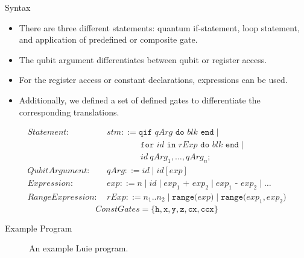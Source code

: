 \begin{frame}{Syntax}
    \begin{itemize}
        \item There are three different statements: quantum if-statement, loop statement, and application of predefined or composite gate.
        \item The qubit argument differentiates between qubit or register access.
        \item For the register access or constant declarations, expressions can be used.
        \item Additionally, we defined a set of defined gates to differentiate the corresponding translations.
    \end{itemize}
    \begin{align*}
        Statement: \ & stm ::= \texttt{qif } qArg \texttt{ do }  blk \texttt{ end} \mid\\
                     & \quad \quad \quad \quad \texttt{for } id \texttt{ in } rExp \texttt{ do } blk \texttt{ end} \mid \\
                     & \quad \quad \quad \quad id \ qArg_1, \dots, qArg_n \texttt{;}\\
        QubitArgument: \ & qArg ::= id \mid id[exp]\\
        Expression: \ & exp ::= n \mid id \mid exp_1 \texttt{ + } exp_2 \mid exp_1 \texttt{ - } exp_2 \mid \dots\\
        RangeExpression: \ & rExp ::= n_1 .. n_2 \mid \texttt{range(} exp \texttt{)} \mid \texttt{range(} exp_1, exp_2 \texttt{)}
    \end{align*}
    \vspace{\alignmargin}
    \begin{equation*}
        ConstGates = \{\texttt{h}, \texttt{x}, \texttt{y}, \texttt{z}, \texttt{cx}, \texttt{ccx}\}
    \end{equation*}
\end{frame}

\begin{frame}{Example Program}
    \begin{figure}[htp]
        \centering     
        
        \caption{An example Luie program.}
        \label{fig:qft_example}
    \end{figure}
\end{frame}


